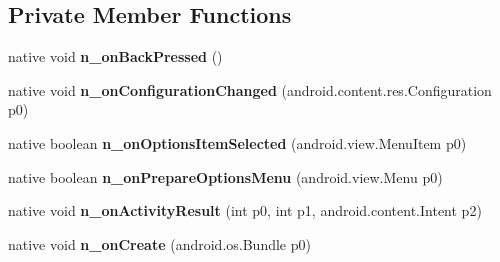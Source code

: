 \subsection*{Private Member Functions}
\begin{DoxyCompactItemize}
\item 
\mbox{\label{classmd5b60ffeb829f638581ab2bb9b1a7f4f3f_1_1FormsApplicationActivity_aac3983f4085466646a1bef286ee44d22}} 
native void {\bfseries n\+\_\+on\+Back\+Pressed} ()
\item 
\mbox{\label{classmd5b60ffeb829f638581ab2bb9b1a7f4f3f_1_1FormsApplicationActivity_a88e1391180bf7d09a68cf9dd7c010206}} 
native void {\bfseries n\+\_\+on\+Configuration\+Changed} (android.\+content.\+res.\+Configuration p0)
\item 
\mbox{\label{classmd5b60ffeb829f638581ab2bb9b1a7f4f3f_1_1FormsApplicationActivity_aead7f610c620e57a4d2d88d671a4c54d}} 
native boolean {\bfseries n\+\_\+on\+Options\+Item\+Selected} (android.\+view.\+Menu\+Item p0)
\item 
\mbox{\label{classmd5b60ffeb829f638581ab2bb9b1a7f4f3f_1_1FormsApplicationActivity_aa32145b7d59e5cd58a5d92e9f3b27d4e}} 
native boolean {\bfseries n\+\_\+on\+Prepare\+Options\+Menu} (android.\+view.\+Menu p0)
\item 
\mbox{\label{classmd5b60ffeb829f638581ab2bb9b1a7f4f3f_1_1FormsApplicationActivity_aa1c5897431d89f265b491c980b75174c}} 
native void {\bfseries n\+\_\+on\+Activity\+Result} (int p0, int p1, android.\+content.\+Intent p2)
\item 
\mbox{\label{classmd5b60ffeb829f638581ab2bb9b1a7f4f3f_1_1FormsApplicationActivity_ab22f0c6a22f2ddb60c0a6708e3cbb935}} 
native void {\bfseries n\+\_\+on\+Create} (android.\+os.\+Bundle p0)
\item 
\mbox{\label{classmd5b60ffeb829f638581ab2bb9b1a7f4f3f_1_1FormsApplicationActivity_aec7d245791c8b4e3e29a25bad16ae30c}} 

\end{DoxyCompactItemize}
